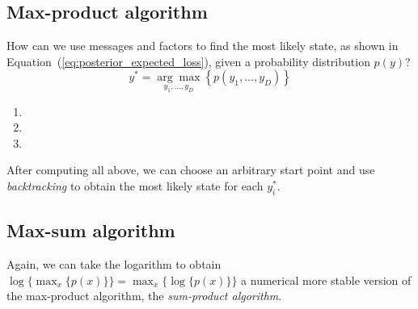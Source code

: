 \subsection{Max-product algorithm}
How can we use messages and factors to find the most likely state, as shown in Equation~(\ref{eq:posterior_expected_loss}), given a probability distribution \ensuremath{p(y)}? %
\begin{equation}
	y^* = \underset{y_1,\ldots,y_D}{\arg\max} \left\{ p(y_1,\ldots,y_D) \right\}
	\label{eq:posterior_expected_loss}
\end{equation}
\begin{enumerate}
	\item {}
	\item {}
	\item {}
\end{enumerate}
After computing all above, we can choose an arbitrary start point and use \emph{backtracking} to obtain the most likely state for each \ensuremath{y^*_i}. %
%
%
%
\subsection{Max-sum algorithm}
Again, we can take the logarithm to obtain \ensuremath{\log\{ \max_x \{ p(x) \} \} = \max_x\{ \log \{ p(x) \} \}} a numerical more stable version of the max-product algorithm, the \emph{sum-product algorithm}. %
%
%
%
